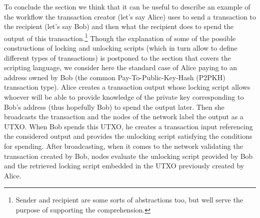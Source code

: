 To conclude the section we think that it can be useful to describe an example of the workflow the transaction creator (let's say Alice) uses to send a transaction to the recipient (let's say Bob) and then what the recipient does to spend the output of this transaction.\footnote{Sender and recipient are some sorts of abstractions too, but well serve the purpose of supporting the comprehension.} Though the explanation of some of the possible constructions of locking and unlocking scripts (which in turn allow to define different types of transactions) is postponed to the section that covers the scripting language, we consider here the standard case of Alice paying to an address owned by Bob (the common Pay-To-Public-Key-Hash (P2PKH) transaction type). Alice creates a transaction output whose locking script allows whoever will be able to provide knowledge of the private key corresponding to Bob's address (thus hopefully Bob) to spend the output later. Then she broadcasts the transaction and the nodes of the network label the output as a UTXO. When Bob spends this UTXO, he creates a transaction input referencing the considered output and provides the unlocking script satisfying the conditions for spending. After broadcasting, when it comes to the network validating the transaction created by Bob, nodes evaluate the unlocking script provided by Bob and the retrieved locking script embedded in the UTXO previously created by Alice. 

